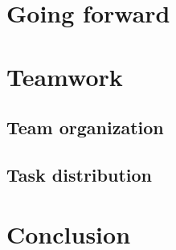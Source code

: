 \documentclass{article}
\begin{document}
\clearpage
\section{Going forward}
\clearpage
\section{Teamwork}
\subsection{Team organization}
\subsection{Task distribution}
\clearpage
\section{Conclusion}

\pagebreak
\nocite{*}


\end{document}

